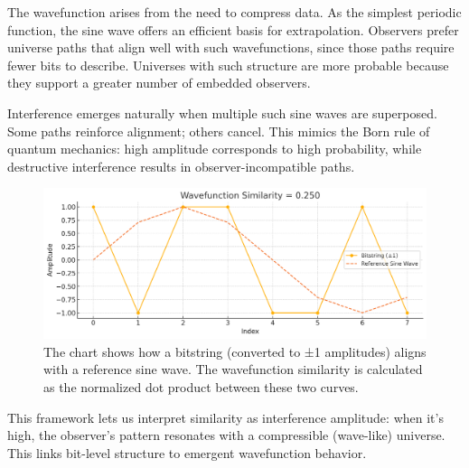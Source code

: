 \documentclass[12pt]{article}
\begin{document}
The wavefunction arises from the need to compress data. As the simplest periodic function, the sine wave offers an efficient basis for extrapolation. Observers prefer universe paths that align well with such wavefunctions, since those paths require fewer bits to describe. Universes with such structure are more probable because they support a greater number of embedded observers.

Interference emerges naturally when multiple such sine waves are superposed. Some paths reinforce alignment; others cancel. This mimics the Born rule of quantum mechanics: high amplitude corresponds to high probability, while destructive interference results in observer-incompatible paths.

\begin{figure}[h!]
      \centering
      \includegraphics[width=1.0\textwidth]{figures/wavefunction_similarity.png}
      \caption{The chart shows how a bitstring (converted to ±1 amplitudes) aligns with a reference sine wave.
            The wavefunction similarity is calculated as the normalized dot product between these two curves.}
      \label{fig:wavefunction_similarity}
\end{figure}


This framework lets us interpret similarity as interference amplitude: when it's high, the observer's pattern resonates with a compressible (wave-like) universe. This links bit-level structure to emergent wavefunction behavior.
\end{document}
